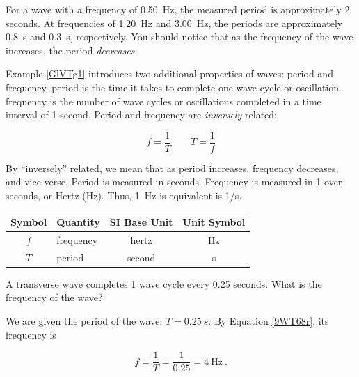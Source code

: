 \documentclass[main.tex]{subfiles}
\begin{document}
\Solution For a wave with a frequency of \SI{0.50}{Hz}, the measured period is approximately 2 seconds. At frequencies of \SI{1.20}{Hz} and \SI{3.00}{Hz}, the periods are approximately \SI{0.8}{s} and \SI{0.3}{s}, respectively. You should notice that as the frequency of the wave increases, the period \textit{decreases}.

\solutionEnd

\vspace{1em}

Example \ref{GlVTg1} introduces two additional properties of waves: period and frequency. \Gls{period} is the time it takes to complete one wave cycle or oscillation. \Gls{frequency} is the number of wave cycles or oscillations completed in a time interval of 1 second. Period and frequency are \textit{inversely} related:

\begin{equation} \label{9WT68r}
    f = \frac{1}{T} \hspace{2em} 
    T = \frac{1}{f}
\end{equation}

By ``inversely'' related, we mean that as period increases, frequency decreases, and vice-verse. Period is measured in seconds. Frequency is measured in 1 over seconds, or Hertz (Hz). Thus, \SI{1}{Hz} is equivalent is 1/s.

\begin{center}
    \begin{tabular}{cl|cc}
    \hline
    \textbf{Symbol} & \textbf{Quantity} & \textbf{SI Base Unit} & \textbf{Unit Symbol}  \\
    \hline\hline
        $f$ & frequency & hertz & \si{\Hz}\\
        $T$ & period & second & s\\
    \hline
    \end{tabular}
\end{center}

\begin{example}
    A transverse wave completes 1 wave cycle every 0.25 seconds. What is the frequency of the wave?
\end{example}

\Solution We are given the period of the wave: $T = \SI{0.25}{s}$. By Equation \ref{9WT68r}, its frequency is

\begin{equation*}
    f = \frac{1}{T} = \frac{1}{0.25} = \SI{4}{\Hz}\ .
\end{equation*}
\end{document}
